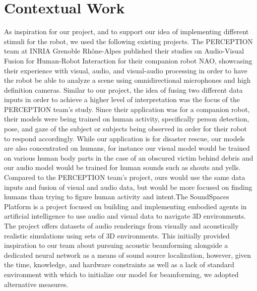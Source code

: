\documentclass{article}
\begin{document}
\section{Contextual Work}
As inspiration for our project, and to support our idea of implementing different stimuli for the robot, we used the following existing projects. The PERCEPTION team at INRIA Grenoble Rhône-Alpes published their studies on Audio-Visual Fusion for Human-Robot Interaction for their companion robot NAO, showcasing their experience with visual, audio, and visual-audio processing in order to have the robot be able to analyze a scene using omnidirectional microphones and high definition cameras. Similar to our project, the idea of fusing two different data inputs in order to achieve a higher level of interpretation was the focus of the PERCEPTION team’s study. Since their application was for a companion robot, their models were being trained on human activity, specifically person detection, pose, and gaze of the subject or subjects being observed in order for their robot to respond accordingly. While our application is for disaster rescue, our models are also concentrated on humans, for instance our visual model would be trained on various human body parts in the case of an obscured victim behind debris and our audio model would be trained for human sounds such as shouts and yells. Compared to the PERCEPTION team’s project, ours would use the same data inputs and fusion of visual and audio data, but would be more focused on finding humans than trying to figure human activity and intent.The SoundSpaces Platform is a project focused on building and implementing embodied agents in artificial intelligence to use audio and visual data to navigate 3D environments. The project offers datasets of audio renderings from visually and acoustically realistic simulations using sets of 3D environments. This initially provided inspiration to our team about pursuing acoustic beamforming alongside a dedicated neural network as a means of sound source localization, however, given the time, knowledge, and hardware constraints as well as a lack of standard environment with which to initialize our model for beamforming, we adopted alternative measures.
\end{document}

